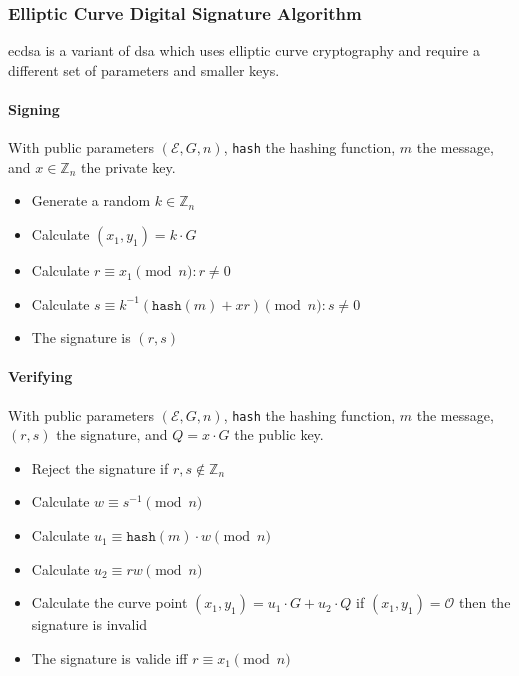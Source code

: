 \subsubsection{Elliptic Curve Digital Signature Algorithm}

\gls{ecdsa} is a variant of \gls{dsa} which uses elliptic curve cryptography and
require a different set of parameters and smaller keys.

\paragraph{Signing}

With public parameters $(\mathcal{E}, G, n)$, \texttt{hash} the hashing function,
$m$ the message, and $x \in \mathbb{Z}_n$ the private key.

\begin{itemize}
  \item Generate a random $k \in \mathbb{Z}_n$
  \item Calculate $(x_1, y_1) = k \cdot G$
  \item Calculate $r \equiv x_1 \pmod n : r \neq 0$
  \item Calculate $s \equiv k^{-1}(\texttt{hash}(m) + xr) \pmod n : s \neq 0$
  \item The signature is $(r, s)$
\end{itemize}

\paragraph{Verifying}

With public parameters $(\mathcal{E}, G, n)$, \texttt{hash} the hashing function,
$m$ the message, $(r, s)$ the signature, and $Q = x \cdot G$ the public key.

\begin{itemize}
  \item Reject the signature if $r, s \notin \mathbb{Z}_n$
  \item Calculate $w \equiv s^{-1} \pmod n$
  \item Calculate $u_1 \equiv \texttt{hash}(m) \cdot w \pmod n$
  \item Calculate $u_2 \equiv rw \pmod n$
  \item Calculate the curve point $(x_1, y_1) = u_1 \cdot G + u_2 \cdot Q$ if
  $(x_1, y_1) = \mathcal{O}$ then the signature is invalid
  \item The signature is valide iff $r \equiv x_1 \pmod n$
\end{itemize}

